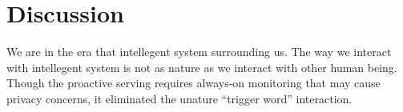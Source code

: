 \section{Discussion}
\label{ch:discuss}


We are in the era that intellegent system surrounding us. The way we interact with intellegent system
is not as nature as we interact with other human being. Though the proactive serving requires
always-on monitoring that may cause privacy concerns, it eliminated 
the unature ``trigger word'' interaction.




\cleardoublepage
